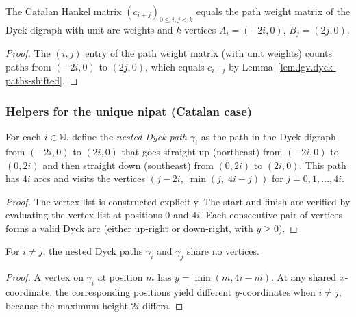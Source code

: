 \begin{lemma}
\label{lem.lgv.catalan-hankel-eq-pwm}
\leanhelper
\leanok
The Catalan Hankel matrix $(c_{i+j})_{0 \le i,j < k}$ equals the
path weight matrix of the Dyck digraph with unit arc weights and
$k$-vertices $A_i = (-2i, 0)$, $B_j = (2j, 0)$.
\end{lemma}

\begin{proof}
\leanok
The $(i,j)$ entry of the path weight matrix (with unit weights) counts
paths from $(-2i, 0)$ to $(2j, 0)$, which equals $c_{i+j}$ by
Lemma~\ref{lem.lgv.dyck-paths-shifted}.
\end{proof}

\subsubsection{Helpers for the unique nipat (Catalan case)}

\begin{lemma}
\label{lem.lgv.nestedDyckPath}
\leanhelper
\leanok
For each $i \in \mathbb{N}$, define the \emph{nested Dyck path}
$\gamma_i$ as the path in the Dyck digraph from $(-2i, 0)$ to $(2i, 0)$
that goes straight up (northeast) from $(-2i, 0)$ to $(0, 2i)$ and
then straight down (southeast) from $(0, 2i)$ to $(2i, 0)$.
This path has $4i$ arcs and visits the vertices
$(j - 2i,\; \min(j,\; 4i - j))$ for $j = 0, 1, \ldots, 4i$.
\end{lemma}

\begin{proof}
The vertex list is constructed explicitly.
The start and finish are verified by evaluating the vertex list at positions
$0$ and $4i$.  Each consecutive pair of vertices forms a valid Dyck arc
(either up-right or down-right, with $y \ge 0$).
\end{proof}

\begin{lemma}
\label{lem.lgv.nestedDyckPath-disjoint}
\leanhelper
\leanok
For $i \ne j$, the nested Dyck paths $\gamma_i$ and $\gamma_j$
share no vertices.
\end{lemma}

\begin{proof}
\leanok
A vertex on $\gamma_i$ at position $m$ has
$y = \min(m, 4i - m)$.  At any shared $x$-coordinate,
the corresponding positions yield different $y$-coordinates
when $i \ne j$, because the maximum height $2i$ differs.
\end{proof}

